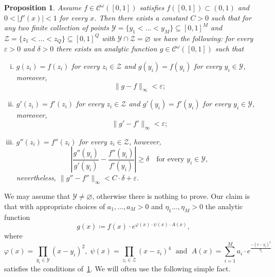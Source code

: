 \documentclass[12pt,]{article}
\def\cref#1{\ref{#1}}%
\newtheorem{proposition}[theorem]{Proposition}
\theoremstyle{definition}
\theoremstyle{remark}
\newcommand{\0}{\mathbf{0}}
\begin{document}
{\begin{proposition}\label{prop:AnalyticBumpFunc}
Assume $f\in \mathcal{C}^{\omega}([0,1])$ satisfies $f([0,1])\subset (0,1)$ and $0<|f'(x)|<1$ for
every $x$. Then there exists a constant $C>0$ such that for any two finite collection of points
$\mathcal{Y}=\{y_1<\ldots<y_M\}\subseteq[0,1]^M$ and $\mathcal{Z}=\{z_1<\ldots<
z_Q\}\subseteq[0,1]^Q$ with $\mathcal{Y}\cap\mathcal{Z}=\varnothing$ we have the following: for
every $\varepsilon>0$ and $\delta>0$ there exists an analytic function
$g\in\mathcal{C}^{\omega}([0,1])$ such that
\begin{enumerate}[(i)]
\item $g(z_i)=f(z_i)$ for every $z_i\in\mathcal{Z}$ and $g(y_i)=f(y_i)$ for every $y_i\in\mathcal{Y}$, moreover,
\begin{equation*}
\|g-f\|_{\infty}<\varepsilon;
\end{equation*}
\item  $g'(z_i)=f'(z_i)$ for every $z_i\in\mathcal{Z}$ and $g'(y_i)=f'(y_i)$ for every $y_i\in\mathcal{Y}$, moreover,
\begin{equation*}
	\|g'-f'\|_{\infty}<\varepsilon;
\end{equation*}
\item $g''(z_i)=f''(z_i)$ for every $z_i\in\mathcal{Z}$, however,
\begin{equation*}
	\left| \frac{g''(y_i)}{g'(y_i)} - \frac{f''(y_i)}{f'(y_i)} \right|\geq \delta \quad\text{
	for every } y_i\in\mathcal{Y},
\end{equation*}
nevertheless, $	\|g''-f''\|_{\infty}<C\cdot \delta +\varepsilon$.
\end{enumerate}
\end{proposition}

We may assume that $\mathcal{Y}\neq\varnothing$, otherwise there is nothing to prove. Our claim is
that with appropriate choices of $a_1,\ldots,a_M>0$ and $\eta_1\ldots,\eta_M>0$ the analytic
function
\begin{equation}\label{eq:BumpFunc}
g(x)\coloneqq f(x)\cdot e^{\varphi(x)\cdot \psi(x)\cdot A(x)},
\end{equation} 
where
\begin{equation*}
\varphi(x)=\prod_{y_i\in\mathcal{Y}} (x-y_i)^2,\; \psi(x) = \prod_{z_i\in\mathcal{Z}} (x-z_i)^4
\;\text{ and }\; A(x)= \sum_{i=1}^{M} a_i\cdot e^{\frac{-(x-y_i)^2}{\eta_i}}
\end{equation*}
satisfies the conditions of~\cref{prop:AnalyticBumpFunc}. We will often use the following simple fact.

}
\end{document}
